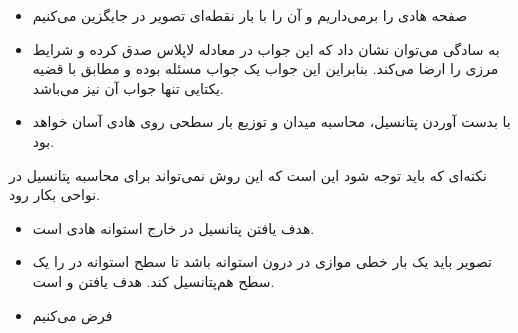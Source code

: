 \ELhold


\begin{ELunit}

\begin{itemize}
\tightlist
\item
  صفحه هادی را برمی‌داریم و آن را با بار نقطه‌ای تصویر  در  جایگزین می‌کنیم
\end{itemize}


\end{ELunit}

\begin{ELimportant}{}


\end{ELimportant}

\begin{ELunit}

\begin{itemize}
\tightlist
\item
  به سادگی می‌توان نشان داد که این جواب در معادله لاپلاس صدق کرده و شرایط مرزی را ارضا می‌کند. بنابراین این جواب یک جواب مسئله بوده و مطابق با قضیه یکتایی تنها جواب آن نیز می‌باشد.
\item
  با بدست آوردن پتانسیل، محاسبه میدان و توزیع بار سطحی روی هادی آسان خواهد بود.
\end{itemize}

\end{ELunit}

\begin{ELremark}{}

نکته‌ای که باید توجه شود این است که این روش نمی‌تواند برای محاسبه پتانسیل در نواحی  بکار رود.

\end{ELremark}

\ELhold


\begin{ELunit}


\begin{itemize}
\tightlist
\item
  هدف یافتن پتانسیل در خارج استوانه هادی است.
\item
  تصویر باید یک بار خطی موازی در درون استوانه باشد تا سطح استوانه در  را یک سطح هم‌پتانسیل کند. هدف یافتن  و  است.
\item
  فرض می‌کنیم
\end{itemize}

\end{ELunit}

